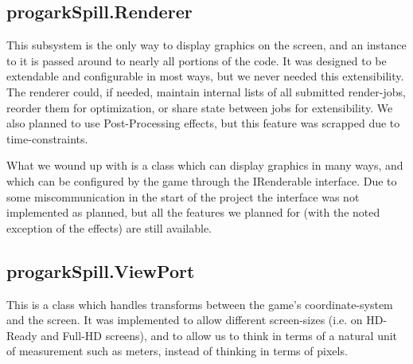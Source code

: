 \subsection{progarkSpill.Renderer}
This subsystem is the only way to display graphics on the screen, and an
instance to it is passed around to nearly all portions of the code. It was
designed to be extendable and configurable in most ways, but we never needed
this extensibility. The renderer could, if needed, maintain internal lists of
all submitted render-jobs, reorder them for optimization, or share state 
between jobs for extensibility. We also planned to use Post-Processing effects,
but this feature was scrapped due to time-constraints.

What we wound up with is a class which can display graphics in many ways, and
which can be configured by the game through the IRenderable interface. Due to
some miscommunication in the start of the project the interface was not 
implemented as planned, but all the features we planned for (with the noted
exception of the effects) are still available.

\subsection{progarkSpill.ViewPort}
This is a class which handles transforms between the game's coordinate-system
and the screen. It was implemented to allow different screen-sizes (i.e. on
HD-Ready and Full-HD screens), and to allow us to think in terms of a natural
unit of measurement such as meters, instead of thinking in terms of pixels.